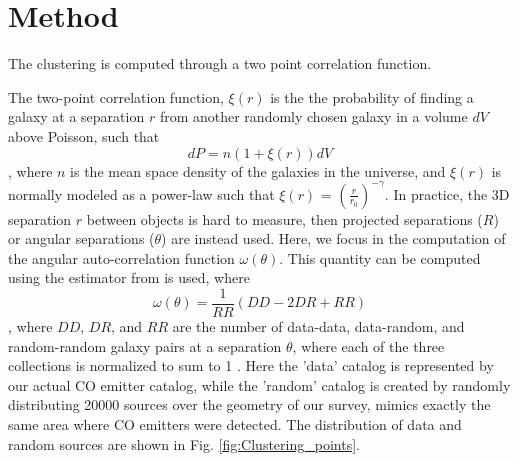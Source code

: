 \section{Method}

The clustering is computed through a two point correlation function. %

The two-point correlation function, $ \xi(r)$ is the the probability of finding a galaxy at a separation $r$ from another randomly chosen galaxy in a volume $dV$ above Poisson, such that $$ dP = n(1 + \xi(r))dV $$, where $n$ is the mean space density of the galaxies in the universe\cite{hickox2011clustering}, and $\xi(r)$ is normally modeled as a power-law such that $\xi(r)$ = $(\frac{r}{r_0})^{-\gamma}$. In practice, the 3D separation $r$ between objects is hard to measure, then projected separations ($R$) or angular separations ($\theta$) are instead used. Here, we focus in the computation of the angular auto-correlation function $\omega(\theta)$. This quantity can be computed using the estimator from \cite{1993ApJ...412...64L} is used, where $$ \omega(\theta) = \frac{1}{RR}(DD-2DR + RR)$$, where $DD$, $DR$, and $RR$ are the number of data-data, data-random, and random-random galaxy pairs at a separation $\theta$, where each of the three collections is normalized to sum to 1 \cite{hickox2011clustering}. Here the 'data' catalog is represented by our actual CO emitter catalog, while the 'random' catalog is created by randomly distributing 20000 sources over the geometry of our survey, mimics exactly the same area where CO emitters were detected. The distribution of data and random sources are shown in Fig. \ref{fig:Clustering_points}.





